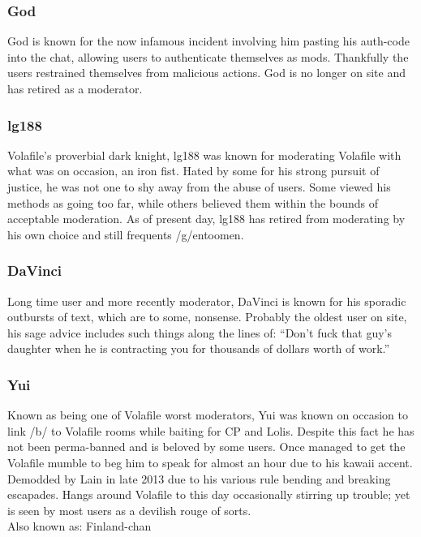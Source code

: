 \documentclass[12pt]{report}
\begin{document}
{\subsubsection{God}
	God is known for the now infamous incident involving him pasting his auth-code into the chat, allowing users to authenticate themselves as mods. Thankfully the users restrained themselves from malicious actions. God is no longer on site and has retired as a moderator.
	
	 
\subsubsection{lg188}
Volafile's proverbial dark knight, lg188 was known for moderating Volafile with what was on occasion, an iron fist. Hated by some for his strong pursuit of justice, he was not one to shy away from the abuse of users. Some viewed his methods as going too far, while others believed them within the bounds of acceptable moderation. As of present day, lg188 has retired from moderating by his own choice and still frequents /g/entoomen.
	
\subsubsection{DaVinci}
	Long time user and more recently moderator, DaVinci is known for his sporadic outbursts of text, which are to some, nonsense. Probably the oldest user on site, his sage advice includes such things along the lines of: ``Don't fuck that guy's daughter when he is contracting you for thousands of dollars worth of work.'' 
\vfill
\pagebreak
\subsubsection{Yui}
	Known as being one of Volafile worst moderators, Yui was known on occasion to link /b/ to Volafile rooms while baiting for CP and Lolis. Despite this fact he has not been perma-banned and is beloved by some users. Once managed to get the Volafile mumble to beg him to speak for almost an hour due to his kawaii accent. Demodded by Lain in late 2013 due to his various rule bending and breaking escapades. Hangs around Volafile to this day occasionally stirring up trouble; yet is seen by most users as a devilish rouge of sorts.
	\\
	Also known as: Finland-chan

}
\end{document}
